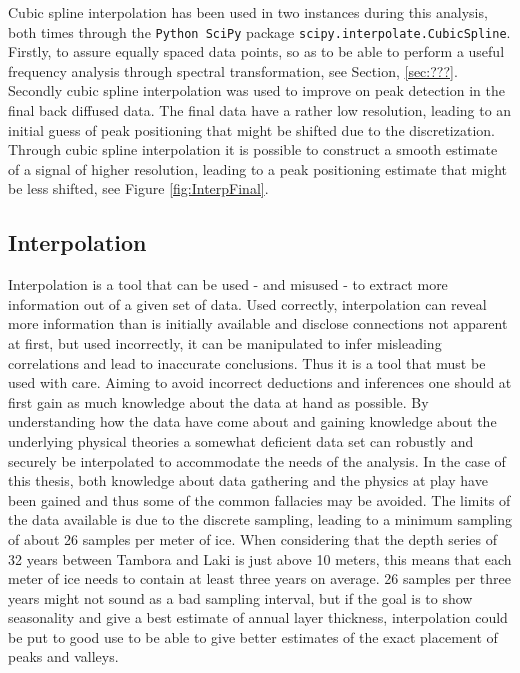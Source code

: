 \documentclass[../../CompleteThesis2/Complete_2ndDraft]{subfiles}
\begin{document}
Cubic spline interpolation has been used in two instances during this analysis, both times through the \lstinline[language=Python]|Python SciPy| package \lstinline[language=Python]|scipy.interpolate.CubicSpline|. Firstly, to assure equally spaced data points, so as to be able to perform a useful frequency analysis through spectral transformation, see Section, \ref{sec:???}. Secondly cubic spline interpolation was used to improve on peak detection in the final back diffused data. The final data have a rather low resolution, leading to an initial guess of peak positioning that might be shifted due to the discretization. Through cubic spline interpolation it is possible to construct a smooth estimate of a signal of higher resolution, leading to a peak positioning estimate that might be less shifted, see Figure \ref{fig:InterpFinal}.


\subsection[Interpolation][Interpolation]{Interpolation}
\label{Subsec:CompMeths_SplinesAndInterpolation_Interpolation}

Interpolation is a tool that can be used - and misused - to extract more information out of a given set of data. Used correctly, interpolation can reveal more information than is initially available and disclose connections not apparent at first, but used incorrectly, it can be manipulated to infer misleading correlations and lead to inaccurate conclusions. Thus it is a tool that must be used with care. Aiming to avoid incorrect deductions and inferences one should at first gain as much knowledge about the data at hand as possible. By understanding how the data have come about and gaining knowledge about the underlying physical theories a somewhat deficient data set can robustly and securely be interpolated to accommodate the needs of the analysis. In the case of this thesis, both knowledge about data gathering and the physics at play have been gained and thus some of the common fallacies may be avoided. The limits of the data available is due to the discrete sampling, leading to a minimum sampling of about 26 samples per meter of ice.
When considering that the depth series of 32 years between Tambora and Laki is just above 10 meters, this means that each meter of ice needs to contain at least three years on average. 26 samples per three years might not sound as a bad sampling interval, but if the goal is to show seasonality and give a best estimate of annual layer thickness, interpolation could be put to good use to be able to give better estimates of the exact placement of peaks and valleys.
\end{document}
